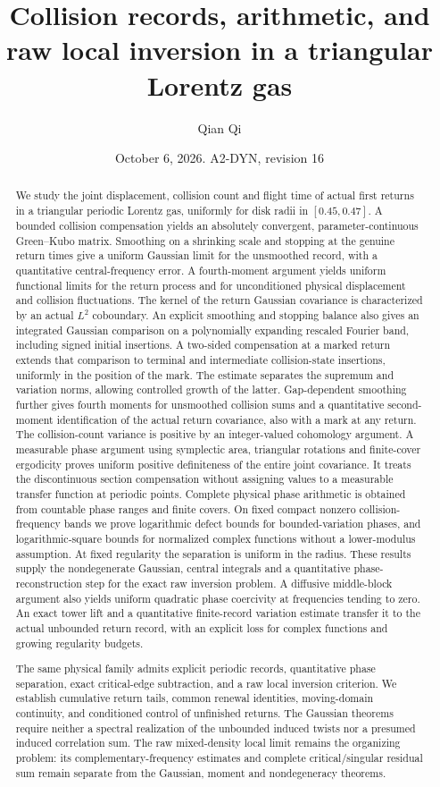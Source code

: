 \documentclass[11pt,reqno]{amsart}
\title[Collision records and raw local inversion]{Collision records, arithmetic, and raw local inversion in a triangular Lorentz gas}
\author{Qian Qi}
\date{October 6, 2026. A2-DYN, revision 16}
\numberwithin{equation}{section}
\theoremstyle{definition}\newtheorem{definition}[theorem]{Definition}
\theoremstyle{remark}\newtheorem{remark}[theorem]{Remark}
\begin{document}
\raggedbottom
\begin{abstract}
We study the joint displacement, collision count and flight time of
actual first returns in a triangular periodic Lorentz gas, uniformly
for disk radii in $[0.45,0.47]$. A bounded collision compensation yields
an absolutely convergent, parameter-continuous Green--Kubo matrix.
Smoothing on a shrinking scale and stopping at the genuine return
times give a uniform Gaussian limit for the unsmoothed record, with a
quantitative central-frequency error. A fourth-moment argument yields
uniform functional limits for the return process and for unconditioned
physical displacement and collision fluctuations. The kernel of the
return Gaussian covariance is characterized by an actual $L^2$
coboundary. An explicit smoothing and stopping balance also gives
an integrated Gaussian comparison on a polynomially expanding rescaled
Fourier band, including signed initial insertions. A two-sided compensation at a
marked return extends that comparison to terminal and intermediate
collision-state insertions, uniformly in the position of the mark.
The estimate separates the supremum and variation norms, allowing
controlled growth of the latter. Gap-dependent smoothing further gives fourth moments for unsmoothed
collision sums and a quantitative second-moment identification of the
actual return covariance, also with a mark at any return. The collision-count
variance is positive by an integer-valued cohomology argument. A measurable
phase argument using symplectic area, triangular rotations and finite-cover
ergodicity proves uniform positive definiteness of the entire joint
covariance. It treats the discontinuous section compensation without
assigning values to a measurable transfer function at periodic points.
Complete physical phase arithmetic is obtained from countable phase
ranges and finite covers. On fixed compact nonzero collision-frequency
bands we prove logarithmic defect bounds for bounded-variation phases,
and logarithmic-square bounds for normalized complex functions without
a lower-modulus assumption. At fixed regularity the separation is uniform
in the radius. These results supply the nondegenerate Gaussian, central
integrals and a quantitative phase-reconstruction step for the exact raw
inversion problem. A diffusive middle-block argument also yields uniform
quadratic phase coercivity at frequencies tending to zero. An exact
tower lift and a quantitative finite-record variation estimate transfer
it to the actual unbounded return record, with an explicit loss for
complex functions and growing regularity budgets.

The same physical family admits explicit periodic records, quantitative
phase separation, exact critical-edge subtraction, and a raw local
inversion criterion. We establish cumulative return tails, common
renewal identities, moving-domain continuity, and conditioned control
of unfinished returns. The Gaussian theorems require neither a spectral
realization of the unbounded induced twists nor a presumed induced
correlation sum. The raw mixed-density local limit remains the organizing
problem: its complementary-frequency estimates and complete
critical/singular residual sum remain separate from the Gaussian,
moment and nondegeneracy theorems.
\end{abstract}
\end{document}
